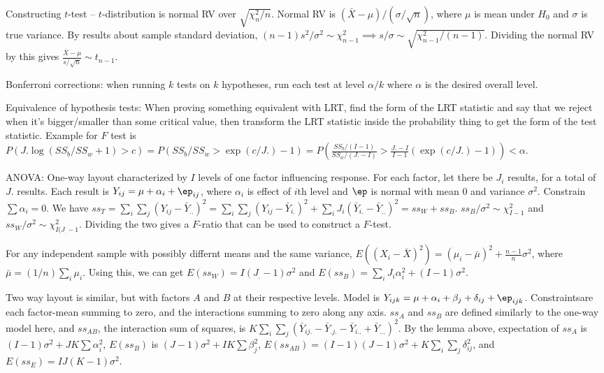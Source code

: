 \documentclass{article}
\begin{document}
Constructing $t$-test -- $t$-distribution is normal RV over $\sqrt{\chi^2_n/n}$. Normal RV is $(\bar{X}-\mu)/(\sigma/\sqrt{n})$, where $\mu$ is mean under $H_0$ and $\sigma$ is true variance. By results about sample standard deviation, $(n-1)s^2/\sigma^2\sim\chi^2_{n-1}\implies s/\sigma\sim\sqrt{\chi^2_{n-1}/(n-1)}$. Dividing the normal RV by this gives $\frac{\bar{X}-\mu}{s/\sqrt{n}}\sim t_{n-1}$.

Bonferroni corrections: when running $k$ tests on $k$ hypotheses, run each test at level $\alpha/k$ where $\alpha$ is the desired overall level.

Equivalence of hypothesis tests: When proving something equivalent with LRT, find the form of the LRT statistic and say that we reject when it's bigger/smaller than some critical value, then transform the LRT statistic inside the probability thing to get the form of the test statistic. Example for $F$ test is $P(J.\log(SS_b/SS_w+1)>c)=P(SS_b/SS_w>\exp(c/J.)-1)=P\left(\frac{SS_b/(I-1)}{SS_w/(J.-I)}>\frac{J.-I}{I-1}(\exp(c/J.)-1)\right)<\alpha$.

ANOVA: One-way layout characterized by $I$ levels of one factor influencing response. For each factor, let there be $J_i$ results, for a total of $J.$ results. Each result is $Y_{ij}=\mu+\alpha_i+\ep_{ij}$, where $\alpha_i$ is effect of $i$th level and $\ep$ is normal with mean $0$ and variance $\sigma^2$. Constrain $\sum\alpha_i=0$. We have $ss_T=\sum_i\sum_j(Y_{ij}-\bar{Y}_{..})^2=\sum_i\sum_j(Y_{ij}-\bar{Y}_{i.})^2+\sum_iJ_i(\bar{Y}_{i.}-\bar{Y}_{..})^2=ss_W+ss_B$.
$ss_B/\sigma^2\sim\chi^2_{I-1}$ and $ss_W/\sigma^2\sim\chi^2_{I(J_.-1}$. Dividing the two gives a $F$-ratio that can be used to construct a $F$-test. 

For any independent sample with possibly differnt means and the same variance, $E((X_i-\bar{X})^2)=(\mu_i-\bar{\mu})^2+\frac{n-1}{n}\sigma^2$, where $\bar{\mu}=(1/n)\sum_i\mu_i$. Using this, we can get $E(ss_W)=I(J_.-1)\sigma^2$ and $E(ss_B)=\sum_iJ_i\alpha_i^2+(I-1)\sigma^2$. 

Two way layout is similar, but with factors $A$ and $B$ at their respective levels. Model is $Y_{ijk}=\mu+\alpha_i+\beta_j+\delta_{ij}+\ep_{ijk}$. Constraintsare each factor-mean summing to zero, and the interactions summing to zero along any axis. $ss_A$ and $ss_B$ are defined similarly to the one-way model here, and $ss_{AB}$, the interaction sum of squares, is $K\sum_i\sum_j(\bar{Y}_{ij.}-\bar{Y}_{.j.}-\bar{Y}_{i..}+\bar{Y}_{...})^2$. By the lemma above, expectation of $ss_A$ is $(I-1)\sigma^2+JK\sum\alpha_i^2$, $E(ss_B)$ is $(J-1)\sigma^2+IK\sum\beta_j^2$, $E(ss_{AB})=(I-1)(J-1)\sigma^2+K\sum_i\sum_j\delta_{ij}^2$, and $E(ss_E)=IJ(K-1)\sigma^2$. 
\end{document}
